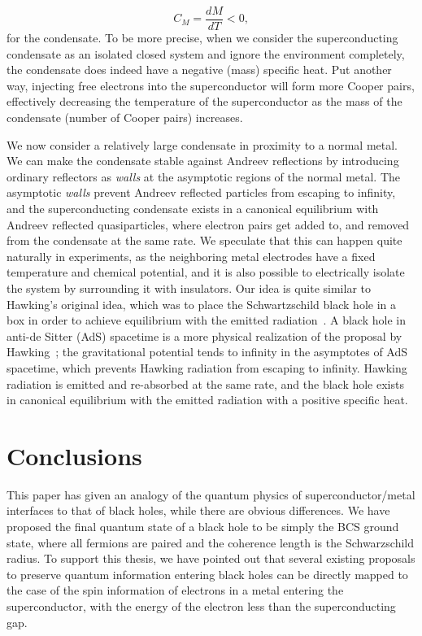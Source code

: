 \documentclass[10pt,letterpaper,aps,onecolumn,superscriptaddress,floatfix,notitlepage]{revtex4-1}
\begin{document}
	\begin{equation}
	C_{M} = \frac{dM}{dT}<0,
	\end{equation}
	for the condensate. To be more precise, when we consider the superconducting condensate as an isolated closed system and ignore the environment completely, the condensate does indeed have a negative (mass) specific heat. Put another way, injecting free electrons into the superconductor will form more Cooper pairs, effectively decreasing the temperature of the superconductor as the mass of the condensate (number of Cooper pairs) increases. 
	
	We now consider a relatively large condensate in proximity to a normal metal. We can make the condensate stable against Andreev reflections by introducing  ordinary reflectors as \textit{walls} at the asymptotic regions of the normal metal. The asymptotic \textit{walls} prevent Andreev reflected particles from escaping to infinity, and the superconducting condensate exists in a canonical equilibrium with Andreev reflected quasiparticles, where electron pairs get added to, and removed from the condensate at the same rate. We speculate that this can happen quite naturally in experiments, as the neighboring metal electrodes have a fixed temperature and chemical potential, and it is also possible to electrically isolate the system by surrounding it with insulators. Our idea is quite similar to Hawking's original idea, which was to place the Schwartzschild black hole in a box in order to achieve equilibrium with the emitted radiation~\cite{hawking1976black}. A black hole in anti-de Sitter (AdS) spacetime is a more physical realization of the proposal by Hawking~\cite{AdS}; the gravitational potential tends to infinity in the asymptotes of AdS spacetime, which prevents Hawking radiation from escaping to infinity. Hawking radiation is emitted and re-absorbed at the same rate, and the black hole exists in canonical equilibrium with the emitted radiation with a  positive specific heat.     
	\section{Conclusions}
	This paper has given an analogy of the quantum physics of superconductor/metal interfaces to that of black holes, while there are obvious differences.  We have proposed the final quantum state of a black hole to be simply the BCS ground state, where all fermions are paired and the coherence length is the Schwarzschild radius.  To support this thesis, we have pointed out that several existing proposals to preserve quantum information entering black holes can be directly mapped to the case of the spin information of electrons in a metal entering the superconductor, with the energy of the electron less than the superconducting gap.  
	
\end{document}

